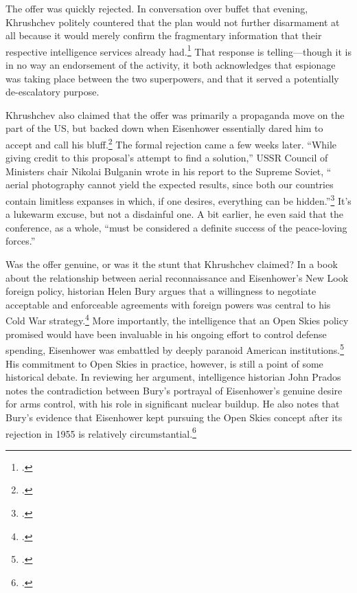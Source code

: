 \documentclass{report}
\begin{document}
\begin{refsegment}
The offer was quickly rejected. In conversation over buffet that evening, Khrushchev politely countered that the plan would not further disarmament at all because it would merely confirm the fragmentary information that their respective intelligence services already had.\footcite{department_of_state_memorandum_1955} That response is telling---though it is in no way an endorsement of the activity, it both acknowledges that espionage was taking place between the two superpowers, and that it served a potentially de-escalatory purpose.

Khrushchev also claimed that the offer was primarily a propaganda move on the part of the US, but backed down when Eisenhower essentially dared him to accept and call his bluff.\footcite[p.~2. This is a secondary source---the book cites a conversation by Eisenhower, quoted in NSC meeting memos that are stored in the Eisenhower library.]{bury_eisenhower_2014} The formal rejection came a few weeks later. ``While giving credit to this proposal's attempt to find a solution,'' USSR Council of Ministers chair Nikolai Bulganin wrote in his report to the Supreme Soviet, ``\textelp{} aerial photography cannot yield the expected results, since both our countries contain limitless expanses in which, if one desires, everything can be hidden.''\footcite{bulganin_meetings_1955} It's a lukewarm excuse, but not a disdainful one. A bit earlier, he even said that the conference, as a whole, ``must be considered a definite success of the peace-loving forces.''

Was the offer genuine, or was it the stunt that Khrushchev claimed? In a book about the relationship between aerial reconnaissance and Eisenhower's New Look foreign policy, historian Helen Bury argues that a willingness to negotiate acceptable and enforceable agreements with foreign powers was central to his Cold War strategy.\footcite[p.~69]{bury_eisenhower_2014} More importantly, the intelligence that an Open Skies policy promised would have been invaluable in his ongoing effort to control defense spending, Eisenhower was embattled by deeply paranoid American institutions.\footcite[p.~212]{bury_eisenhower_2014} His commitment to Open Skies in practice, however, is still a point of some historical debate. In reviewing her argument, intelligence historian John Prados notes the contradiction between Bury's portrayal of Eisenhower's genuine desire for arms control, with his role in significant nuclear buildup. He also notes that Bury's evidence that Eisenhower kept pursuing the Open Skies concept after its rejection in 1955 is relatively circumstantial.\footcite[p.~233-234]{prados_review_2015}


\end{refsegment}
\end{document}
